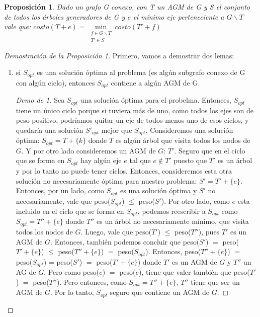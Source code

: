 \documentclass[11pt, a4paper, twoside]{article}
\begin{document}
\newtheorem{prop}{Proposición}
\begin{prop}
Dado un grafo G conexo, con T un AGM de G y S el conjunto de todos los árboles
generadores de G y $e$ el mínimo eje perteneciente a $G \backslash T$ vale que: 
$costo(T+e) = \min\limits_{\substack{f \in G \backslash T \\ T' \in S}} costo(T'+f)$
\end{prop}
\begin{proof}[Demostración de la Proposición 1] 
Primero, vamos a demostrar dos lemas: 
\begin{enumerate}
  \item si $S_{opt}$ es una solución óptima al problema (es algún subgrafo conexo  de G
		con algún ciclo), entonces $S_{opt}$ contiene a algún AGM de G.
		
		\begin{proof}[Demo de 1]
		Sea $S_{opt}$ una solución óptima para el probelma. Entonces, $S_{opt}$ tiene un único ciclo
		porque si tuviera más de uno, como todos los ejes son de peso positivo, podríamos quitar un
		eje de todos menos uno de esos ciclos, y quedaría una solución $S'_{opt}$ mejor que $S_{opt}$.
		Consideremos una solución óptima: $S_{opt} = T + \{k\}$ donde $T$ es algún árbol que visita 
		todos los nodos de $G$. Y por otro lado consideremos un AGM de $G$: $T'$. Seguro que en el ciclo
		que se forma en $S_{opt}$ hay algún eje $e$ tal que $e \not\in T'$ puesto que $T'$ es un árbol y 
		por lo tanto no puede tener ciclos. Entonces, consideremos esta otra solución no necesariamente 
		óptima para nuestro problema: $S' = T' + \{e\}$. Entonces, por un lado, como $S_{opt}$ es una solución
		óptima y $S'$ no necesariamente, vale que peso($S_{opt}$) $\leq$ peso($S'$). Por otro lado, como $e$
		esta incluido en el ciclo que se forma en $S_{opt}$, podemos reescribir a $S_{opt}$ como 
		$S_{opt} = T'' + \{e\}$ donde $T''$ es un árbol no necesariamente mínimo, que visita todos los nodos
		de $G$. Luego, vale que peso($T'$) $\leq$ peso($T''$), pues $T'$ es un AGM de $G$. Entonces, también
		podemos concluir que peso($S'$) $=$ peso($T' + \{e\}$) $\leq$ peso($T''+\{e\}$) $=$ peso($S_{opt}$).
		Entonces, peso($T'' + \{e\}$) $=$ peso($S_{opt}$) = peso($S'$) $=$ peso($ T' + \{e\}$) donde $T'$ es un
		AGM de $G$ y $T''$ un AG de $G$. Pero como peso($e$) $=$ peso($e$), tiene que valer también que
		peso($T'$) $=$ peso($T''$). Pero entonces, como $S_{opt} = T'' + \{e\}$, $T''$ tiene que ser un AGM de
		$G$. Por lo tanto, $S_{opt}$ seguro que contiene un AGM de $G$.
		\end{proof}
  

\end{enumerate}
\end{proof}
\end{document}
